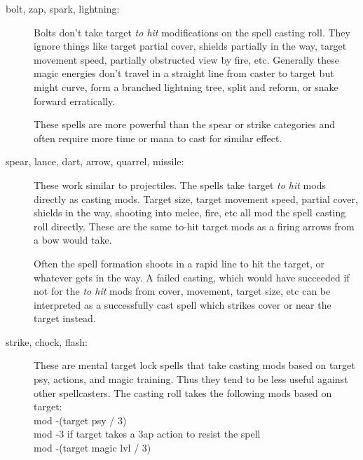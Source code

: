 \begin{description}

\item[bolt, zap, spark, lightning:]
Bolts don't take target \emph{to hit} modifications on the spell casting roll. They ignore things like target partial cover, shields partially in the way, target movement speed, partially obstructed view by fire, etc.
Generally these magic energies don't travel in a straight line from caster to target but might curve, form a branched lightning tree, split and reform, or snake forward erratically.

These spells are more powerful than the spear or strike categories and often require more time or mana to cast for similar effect.


\item[spear, lance, dart, arrow, quarrel, missile:]
These work similar to projectiles. The spells take target \emph{to hit} mods directly as casting mods. Target size, target movement speed, partial cover, shields in the way, shooting into melee, fire, etc all mod the spell casting roll directly. These are the same to-hit target mods as a firing arrows from a bow would take. 


Often the spell formation shoots in a rapid line to hit the target, or whatever gets in the way. A failed casting, which would have succeeded if not for the \emph{to hit} mods from cover, movement, target size, etc can be interpreted as a successfully cast spell which strikes cover or near the target instead.



\item[strike, chock, flash:] %
These are mental target lock spells that take casting mods based on target psy, actions, and magic training. Thus they tend to be less useful against other spellcasters. The casting roll takes the following mods based on target:\\
mod -(target psy / 3)\\
mod -3 if target takes a 3ap action to resist the spell\\
mod -(target magic lvl / 3)\\

\end{description}


